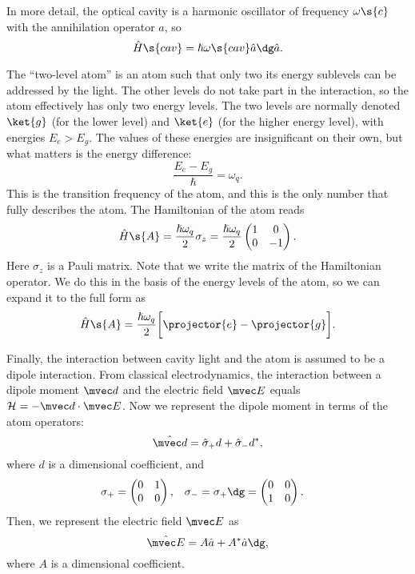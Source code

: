 \documentclass[fontsize=9pt,bookmarkpackage=false]{scrartcl}
\renewcommand{\hbar}{\hslash}
\begin{document}
In more detail, the optical cavity is a harmonic oscillator of frequency $\omega\s{c}$ with the annihilation operator $\hat a$, so
\begin{equation}
  \hat H\s{cav} = \hbar \omega\s{cav} \hat a\dg \hat a.
\end{equation}

The ``two-level atom'' is an atom such that only two its energy sublevels can be addressed by the light.
The other levels do not take part in the interaction, so the atom effectively has only two energy levels.
The two levels are normally denoted $\ket{g}$ (for the lower level) and $\ket{e}$ (for the higher energy level), with energies $E_e > E_g$.
The values of these energies are insignificant on their own, but what matters is the energy difference:
\begin{equation}
  \frac{ E_e - E_g }{ \hbar } = \omega_q.
\end{equation}
This is the transition frequency of the atom, and this is the only number that fully describes the atom.
The Hamiltonian of the atom reads
\begin{equation}
  \hat H\s{A}
  = \frac{ \hbar \omega_q }{ 2 } \sigma_z
  = \frac{ \hbar \omega_q }{ 2 }
  \begin{pmatrix}
    1 & 0 \\ 0 & - 1
  \end{pmatrix}.
\end{equation}
Here $\sigma_z$ is a Pauli matrix.
Note that we write the matrix of the Hamiltonian operator.
We do this in the basis of the energy levels of the atom, so we can expand it to the full form as
\begin{equation}
  \hat H\s{A}
  = \frac{ \hbar \omega_q }{ 2 }
  \bigg[ \projector{e} -  \projector{g} \bigg].
\end{equation}

Finally, the interaction between cavity light and the atom is assumed to be a dipole interaction.
From classical electrodynamics, the interaction between a dipole moment $\mvec d$ and the electric field $\mvec E$ equals $\mathcal H = - \mvec d \cdot \mvec E$.
Now we represent the dipole moment in terms of the atom operators:
\begin{equation}
  \hat { \mvec d } = \hat \sigma_+ d + \hat \sigma_- d^*,
\end{equation}
where $d$ is a dimensional coefficient, and
\begin{align}
  \sigma_+ & =
  \begin{pmatrix}
    0 & 1 \\ 0 & 0
  \end{pmatrix},
  &
  \sigma_- = \sigma_+\dg & =
  \begin{pmatrix}
    0 & 0 \\ 1 & 0
  \end{pmatrix}.
\end{align}
Then, we represent the electric field $\mvec E$ as
\begin{equation}
  \hat{\mvec E }= A \hat a + A^* \hat a\dg,
\end{equation}
where $A$ is a dimensional coefficient.
\end{document}

